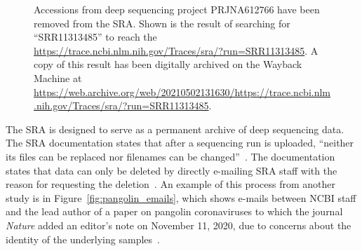 \documentclass[9pt,twocolumn,twoside]{gsajnl_modified}
\begin{document}
\begin{figure}[]
\centering
{}
\caption{Accessions from deep sequencing project PRJNA612766 have been removed from the SRA.
Shown is the result of searching for ``SRR11313485'' to reach the \url{https://trace.ncbi.nlm.nih.gov/Traces/sra/?run=SRR11313485}.
A copy of this result has been digitally archived on the Wayback Machine at \url{https://web.archive.org/web/20210502131630/https://trace.ncbi.nlm.nih.gov/Traces/sra/?run=SRR11313485}.
}%
\label{fig:acc_removed}
\end{figure}

The SRA is designed to serve as a permanent archive of deep sequencing data.
The SRA documentation states that after a sequencing run is uploaded, ``neither its files can be replaced nor filenames can be changed''~\citep{SRA_deletion}.
The documentation states that data can only be deleted by directly e-mailing SRA staff with the reason for requesting the deletion~\citep{SRA_deletion}.
An example of this process from another study is in Figure~\ref{fig:pangolin_emails}, which shows e-mails between NCBI staff and the lead author of a paper on pangolin coronaviruses to which the journal \textit{Nature} added an editor's note on November 11, 2020, due to concerns about the identity of the underlying samples~\citep{chan2020single}.
\end{document}
